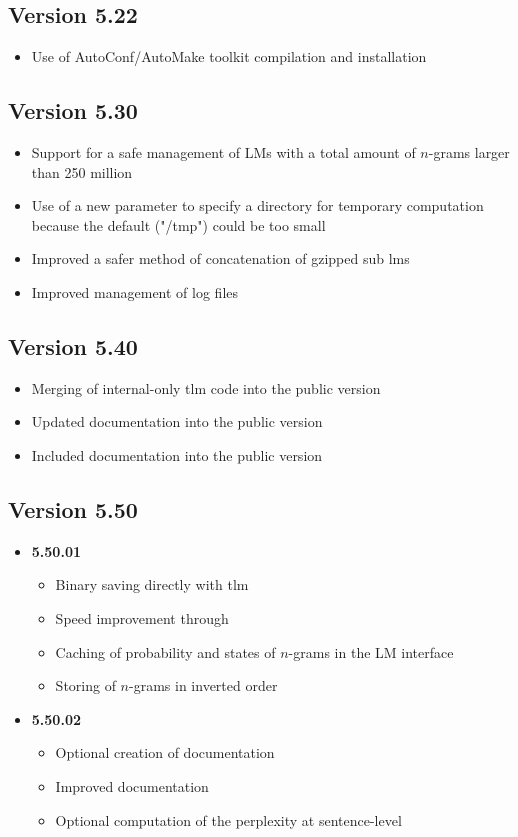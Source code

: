 \subsection{Version 5.22}
\begin{itemize}
\item Use of AutoConf/AutoMake toolkit compilation and installation
\end{itemize}

\subsection{Version 5.30}
\begin{itemize}
\item Support for a safe management of LMs with a total amount of $n$-grams larger than 250 million
\item Use of a new parameter to specify a directory for temporary computation because the default ("/tmp") could be too small
\item Improved a safer method of concatenation of gzipped sub lms
\item Improved management of log files
\end{itemize}

\subsection{Version 5.40}
\begin{itemize}
\item Merging of internal-only tlm code into the public version
\item Updated documentation into the public version
\item Included documentation into the public version
\end{itemize}

\subsection{Version 5.50}

\begin{itemize}
\item {\bf 5.50.01}
\begin{itemize}
\item Binary saving directly with tlm
\item Speed improvement through 
\item Caching of probability and states of $n$-grams in the LM interface
\item Storing of $n$-grams in inverted order
\end{itemize}

\item {\bf 5.50.02}
\begin{itemize}
\item Optional creation of documentation
\item Improved documentation
\item Optional computation of the perplexity at sentence-level
\end{itemize}

\end{itemize}

